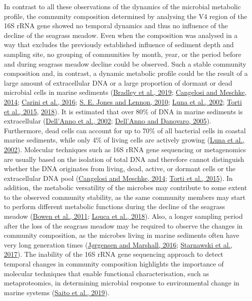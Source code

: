 \documentclass[
  12 pt,
]{book}
\begin{document}
In contrast to all these observations of the dynamics of the microbial metabolic profile, the community composition determined by analysing the V4 region of the 16S rRNA gene showed no temporal dynamics and thus no influence of the decline of the seagrass meadow. Even when the composition was analysed in a way that excludes the previously established influence of sediment depth and sampling site, no grouping of communities by month, year, or the period before and during seagrass meadow decline could be observed. Such a stable community composition and, in contrast, a dynamic metabolic profile could be the result of a large amount of extracellular DNA or a large proportion of dormant or dead microbial cells in marine sediments (\protect\hyperlink{ref-Bradley2019}{Bradley et al., 2019}; \protect\hyperlink{ref-Cangelosi2014}{Cangelosi and Meschke, 2014}; \protect\hyperlink{ref-Carini2016}{Carini et al., 2016}; \protect\hyperlink{ref-Jones2010}{S. E. Jones and Lennon, 2010}; \protect\hyperlink{ref-Luna2002}{Luna et al., 2002}; \protect\hyperlink{ref-Torti2015}{Torti et al., 2015}, \protect\hyperlink{ref-Torti2018}{2018}). It is estimated that over 80\si{\percent} of DNA in marine sediments is extracellular (\protect\hyperlink{ref-DellAnno2002}{Dell'Anno et al., 2002}; \protect\hyperlink{ref-DellAnno2005}{Dell'Anno and Danovaro, 2005}). Furthermore, dead cells can account for up to 70\si{\percent} of all bacterial cells in coastal marine sediments, while only 4\si{\percent} of living cells are actively growing (\protect\hyperlink{ref-Luna2002}{Luna et al., 2002}). Molecular techniques such as 16S rRNA gene sequencing or metagenomics are usually based on the isolation of total DNA and therefore cannot distinguish whether the DNA originates from living, dead, active, or dormant cells or the extracellular DNA pool (\protect\hyperlink{ref-Cangelosi2014}{Cangelosi and Meschke, 2014}; \protect\hyperlink{ref-Torti2015}{Torti et al., 2015}). In addition, the metabolic versatility of the microbes may contribute to some extent to the observed community stability, as the same community members may start to perform different metabolic functions during the decline of the seagrass meadow (\protect\hyperlink{ref-Bowen2011}{Bowen et al., 2011}; \protect\hyperlink{ref-Louca2018}{Louca et al., 2018}). Also, a longer sampling period after the loss of the seagrass meadow may be required to observe the changes in community composition, as the microbes living in marine sediments often have very long generation times (\protect\hyperlink{ref-Jorgensen2016}{Jørgensen and Marshall, 2016}; \protect\hyperlink{ref-Starnawski2017}{Starnawski et al., 2017}). The inability of the 16S rRNA gene sequencing approach to detect temporal changes in community composition highlights the importance of molecular techniques that enable functional characterisation, such as metaproteomics, in determining microbial response to environmental change in marine systems (\protect\hyperlink{ref-Saito2019}{Saito et al., 2019}).
\end{document}
